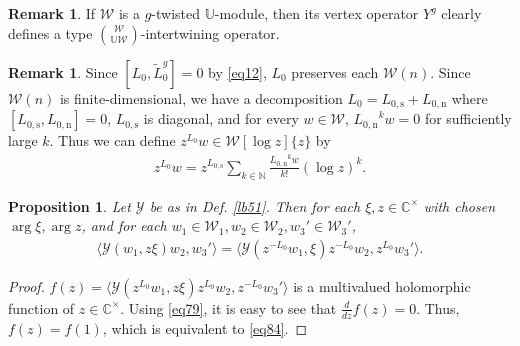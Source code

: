 \documentclass[11pt,b5paper,notitlepage]{article}
\theoremstyle{definition}
\newtheorem{rem}[df]{Remark}
\theoremstyle{plain}
\newtheorem{pp}[df]{Proposition}
\newcommand{\mc}{\mathcal}
\newcommand{\wtd}{\widetilde}
\newcommand{\bk}[1]{\langle {#1}\rangle}
\newcommand{\Ubb}{\mathbb U}
\newcommand{\Cbb}{\mathbb C}
\newcommand{\Nbb}{\mathbb N}
\newcommand{\Lss}{{L_{0,\mathrm{s}}}}
\newcommand{\Lni}{{L_{0,\mathrm{n}}}}
\numberwithin{equation}{subsection}
\begin{document}
\begin{rem}
If $\mc W$ is a $g$-twisted $\Ubb$-module, then its vertex operator $Y^g$ clearly defines a type $\mc W\choose\Ubb\mc W$-intertwining operator.
\end{rem}




\begin{rem}
Since $[L_0,\wtd L_0^g]=0$ by \eqref{eq12}, $L_0$ preserves each $\mc W(n)$. Since $\mc W(n)$ is finite-dimensional, we have a decomposition $L_0=\Lss+\Lni$ where $[\Lss,\Lni]=0$, $\Lss$ is diagonal, and for every $w\in\mc W$, $\Lni^kw=0$ for sufficiently large $k$. Thus we can define $z^{L_0}w\in\mc W[\log z]\{z\}$	by
\begin{align*}
z^{L_0}w=z^\Lss\sum_{k\in\Nbb}\frac{\Lni^k w}{k!}(\log z)^k.
\end{align*}
\end{rem}

\begin{pp}\label{lb56}
Let $\mc Y$ be as in Def. \ref{lb51}. Then for each $\xi,z\in\Cbb^\times$ with chosen $\arg\xi,\arg z$, and for each $w_1\in\mc W_1,w_2\in\mc W_2,w_3'\in\mc W_3'$,
\begin{align}
\bk{\mc Y(w_1,z\xi)w_2,w_3'}=\bk{\mc Y(z^{-L_0}w_1,\xi)z^{-L_0}w_2,z^{L_0}w_3'}.	\label{eq84}
\end{align}
\end{pp}


\begin{proof}
$f(z)=\bk{\mc Y(z^{L_0}w_1,z\xi)z^{L_0}w_2,z^{-L_0}w_3'}$ is a multivalued holomorphic function of $z\in\Cbb^\times$. Using \eqref{eq79}, it is easy to see that $\frac{d}{dz}f(z)=0$. Thus, $f(z)=f(1)$, which is equivalent to \eqref{eq84}.
\end{proof}
\end{document}
